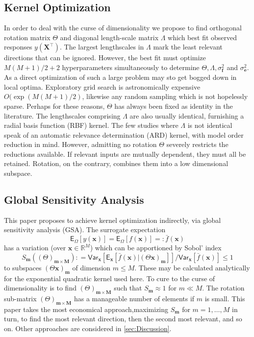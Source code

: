 \documentclass[preprint,12pt]{elsarticle}
\newcommand*{\M}[1]{\ensuremath{#1}\xspace}
\newcommand*{\vr}[1]{\M{\mathbf{#1}}}
\newcommand*{\st}[1]{\M{\mathbb{#1}}}
\newcommand*{\deq}{\M{\mathrel{\mathop:}=}}
\newcommand*{\deqr}{\M{=\mathrel{\mathop:}}}
\newcommand*{\ev}[2][]{\mathsf{E}_{#1}\!\left\lbrack{} #2 \right\rbrack}
\newcommand*{\var}[2][]{\mathsf{Var}_{#1}\!\left\lbrack{} #2 \right\rbrack}
\begin{document}
        \subsection{Kernel Optimization}
            In order to deal with the curse of dimensionality we propose to find orthogonal rotation matrix $\Theta$ and diagonal length-scale matrix $\Lambda$ which best fit observed responses $y(\vr{X}^{\intercal})$. The largest lengthscales in $\Lambda$ mark the least relevant directions that can be ignored. However, the best fit must optimize $M(M+1)/2+2$ hyperparameters simultaneously to determine $\Theta, \Lambda, \sigma^{2}_\vr{f}$ and $\sigma^{2}_\vr{e}$. As a direct optimization of such a large problem may sto get bogged down in local optima. Exploratory grid search is astronomically expensive $O(\exp(M(M+1)/2)$, likewise any random sampling which is not hopelessly sparse. Perhaps for these reasons, $\Theta$ has always been fixed as identity in the literature. The lengthscales comprising $\Lambda$ are also usually identical, furnishing a radial basis function (RBF) kernel. The few studies where $\Lambda$ is not identical speak of an automatic relevance determination (ARD) kernel, with model order reduction in mind. However, admitting no rotation $\Theta$ severely restricts the reductions available. If relevant inputs are mutually dependent, they must all be retained. Rotation, on the contrary, combines them into a low dimensional subspace.

        \subsection{Global Sensitivity Analysis}
            This paper proposes to achieve kernel optimization indirectly, via global sensitivity analysis (GSA).
            The surrogate expectation
            \begin{equation*}
                \ev[\Omega]{y(\vr{x})} = \ev[\Omega]{f(\vr{x})} \deqr \bar{f}(\vr{x})
            \end{equation*}
            has a variation (over $\vr{x} \in \st{R}^{M}$) which can be apportioned by Sobol' index
            \begin{equation*}
                S_{\vr{m}}((\Theta)_{\vr{m}\times\vr{M}}) \deq \var[\vr{x}]{\ev[\vr{x}]{\bar{f}(\vr{x}) \vert (\Theta \vr{x})_{\vr{m}}}} / \var[\vr{x}]{\bar{f}(\vr{x})} \leq 1
            \end{equation*}
            to subspaces $(\Theta \vr{x})_{\vr{m}}$ of dimension $m\leq M$. These may be calculated analytically for the exponential quadratic kernel used here. To cure to the curse of dimensionality is to find $(\Theta)_{\vr{m}\times\vr{M}}$ such that $S_{\vr{m}} \approx 1$ for $m\ll M$. The rotation sub-matrix $(\Theta)_{\vr{m}\times\vr{M}}$ has a manageable number of elements if $m$ is small. This paper takes the most economical approach,maximizing $S_{\vr{m}}$ for $m=1,\ldots,M$ in turn, to find the most relevant direction, then the second most relevant, and so on. Other approaches are considered in \cref{sec:Discussion}.
\end{document}
